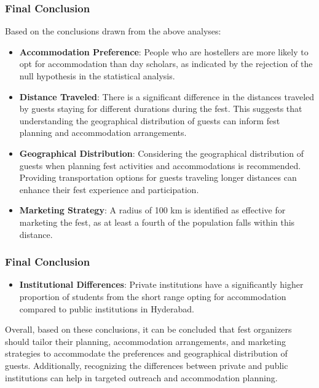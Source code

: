 \documentclass{beamer}
\begin{document}
\begin{frame}
\frametitle{Final Conclusion}
Based on the conclusions drawn from the above analyses:
\begin{itemize}
    \item \textbf{Accommodation Preference}: People who are hostellers are more likely to opt for accommodation than day scholars, as indicated by the rejection of the null hypothesis in the statistical analysis.
    \item \textbf{Distance Traveled}: There is a significant difference in the distances traveled by guests staying for different durations during the fest. This suggests that understanding the geographical distribution of guests can inform fest planning and accommodation arrangements.
    \item \textbf{Geographical Distribution}: Considering the geographical distribution of guests when planning fest activities and accommodations is recommended. Providing transportation options for guests traveling longer distances can enhance their fest experience and participation.
    \item \textbf{Marketing Strategy}: A radius of 100 km is identified as effective for marketing the fest, as at least a fourth of the population falls within this distance.
    \end{itemize}
\end{frame}
\begin{frame}
\frametitle{Final Conclusion}
\begin{itemize}
    \item \textbf{Institutional Differences}: Private institutions have a significantly higher proportion of students from the short range opting for accommodation compared to public institutions in Hyderabad.
\end{itemize}
Overall, based on these conclusions, it can be concluded that fest organizers should tailor their planning, accommodation arrangements, and marketing strategies to accommodate the preferences and geographical distribution of guests. Additionally, recognizing the differences between private and public institutions can help in targeted outreach and accommodation planning.
\end{frame}
\end{document}
